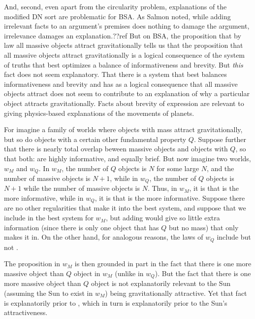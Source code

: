 And, second, even apart from the circularity problem, explanations of the modified DN sort are problematic for BSA.
As Salmon noted, while adding irrelevant facts to an argument's premises does nothing to damage the argument, irrelevance
damages an explanation.??ref But on BSA, the proposition that by law all massive objects attract gravitationally tells us
that the proposition that all massive objects attract gravitationally is a logical consequence of the system
of truths that best optimizes a balance of informativeness and brevity. But \textit{this} fact does not seem explanatory.
That there is a system that best balances informativeness and brevity and has as a logical consequence that all massive
objects attract does not seem to contribute to an explanation of why a particular object attracts gravitationally. Facts 
about brevity of expression are relevant to giving physics-based explanations of the movements of planets. 

For imagine a family of worlds where objects with mass attract gravitationally, but so do objects with a certain other 
fundamental property $Q$. 
Suppose further that there is nearly total overlap beween massive objects and objects with $Q$, so that both:
are highly informative, and equally brief. But now imagine two worlds, $w_M$ and $w_Q$. In $w_M$, the number of $Q$
objects is $N$ for some large $N$, and the number of massive objects is $N+1$, while in $w_Q$, the number of $Q$ objects
is $N+1$ while the number of massive objects is $N$. Thus, in $w_M$, it is  that is the more informative,
while in $w_Q$, it is  that is the more informative. Suppose there are no other regularities that make it
into the best system, and suppose that we include  in the best system for $w_M$, but adding 
would give so little extra information (since there is only one object that has $Q$ but no mass) that only  makes 
it in. On the other hand, for analogous reasons, the laws of $w_Q$ include  but not . 

The proposition  in $w_M$ is then grounded in part in the fact that there is one more massive object
than $Q$ object in $w_M$ (unlike in $w_Q$). But the fact that there is one more massive object than $Q$ object is 
not explanatorily relevant to the Sun (assuming the Sun to exist in $w_M$) being gravitationally attractive. 
Yet that fact is explanatorily prior to , which in turn is explanatorily prior to the Sun's attractiveness.

